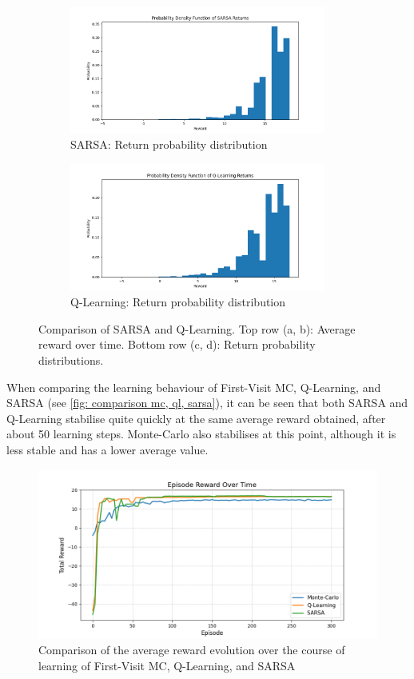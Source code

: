 \documentclass{class}
\begin{document}
\begin{figure}[H]
    \begin{subfigure}[t]{0.47\linewidth}
        \centering
        \includegraphics[height=4.2cm]{../plots/return_probability/sarsa_return_probability.png}
        \caption{SARSA: Return probability distribution}
        \label{fig:sarsa_return_probability}
    \end{subfigure}
    \hspace{0.03\linewidth}
    \begin{subfigure}[t]{0.47\linewidth}
        \centering
        \includegraphics[height=4.2cm]{../plots/return_probability/q_learning_return_probability.png}
        \caption{Q-Learning: Return probability distribution}
        \label{fig:qlearning_return_probability}
    \end{subfigure}

    \caption{Comparison of SARSA and Q-Learning. Top row (a, b): Average reward over time. Bottom row (c, d): Return probability distributions.}
    \label{fig:sarsa_qlearning_comparison}
\end{figure}

\noindent When comparing the learning behaviour of First-Visit MC, Q-Learning, and SARSA (see \autoref{fig: comparison mc, ql, sarsa}), it can be seen that both SARSA and Q-Learning stabilise quite quickly at the same average reward obtained, after about 50 learning steps. Monte-Carlo also stabilises at this point, although it is less stable and has a lower average value. 

\begin{figure}[H]
    \centering
    \includegraphics[width=0.7\linewidth]{../plots/comparison/comparison_plot_final.png}
    \caption{Comparison of the average reward evolution over the course of learning of First-Visit MC, Q-Learning, and SARSA}
    \label{fig: comparison mc, ql, sarsa}
\end{figure}
\end{document}
